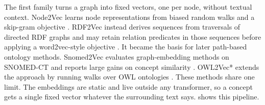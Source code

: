 The first family turns a graph into fixed vectors, one per node, without textual context. Node2Vec
learns node representations from biased random walks and a skip-gram objective
\citep{grover2016node2vec}. RDF2Vec instead derives sequences from traversals of directed RDF
graphs and may retain relation predicates in those sequences before applying a word2vec-style
objective \citep{ristoski2016rdf2vec}. It became the basis for later path-based ontology
methods. Snomed2Vec
evaluates graph-embedding methods on SNOMED-CT and reports large gains on concept similarity
\citep{agarwal2019snomed2vec}. OWL2Vec* extends the approach by running walks over OWL
ontologies \citep{chen2021owl2vec}. These methods share one limit. The embeddings are static
and live outside any transformer, so a concept gets a single fixed vector whatever the
surrounding text says.  shows this pipeline.


